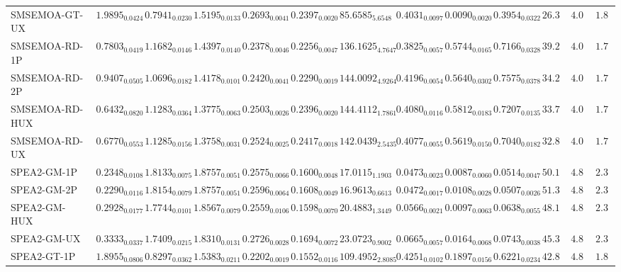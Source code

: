 \documentclass[11pt,a4paper]{article}
\begin{document}
\begin{table}[H]
{\begin{tabular}{lcccccccccccc}
SMSEMOA-GT-UX & $1.9895_{0.0424}$ & $0.7941_{0.0230}$ & $1.5195_{0.0133}$ & $\mathbf{0.2693}_{0.0041}$ & $\mathbf{0.2397}_{0.0020}$ & $85.6585_{5.6548}$ & $0.4031_{0.0097}$ & $0.0090_{0.0020}$ & $0.3954_{0.0322}$ & $26.33$ & $4.00$ & $1.89$ \\
SMSEMOA-RD-1P & $0.7803_{0.0419}$ & $1.1682_{0.0146}$ & $1.4397_{0.0140}$ & $0.2378_{0.0046}$ & $0.2256_{0.0047}$ & $136.1625_{4.7647}$ & $0.3825_{0.0057}$ & $0.5744_{0.0165}$ & $0.7166_{0.0328}$ & $39.22$ & $4.00$ & $\mathbf{1.78}$ \\
SMSEMOA-RD-2P & $0.9407_{0.0505}$ & $1.0696_{0.0182}$ & $\mathbf{1.4178}_{0.0101}$ & $0.2420_{0.0041}$ & $\mathbf{0.2290}_{0.0019}$ & $\mathbf{144.0092}_{4.9264}$ & $0.4196_{0.0054}$ & $0.5640_{0.0302}$ & $0.7575_{0.0378}$ & $34.22$ & $4.00$ & $\mathbf{1.78}$ \\
SMSEMOA-RD-HUX & $0.6432_{0.0820}$ & $1.1283_{0.0364}$ & $\mathbf{1.3775}_{0.0063}$ & $0.2503_{0.0026}$ & $\mathbf{0.2396}_{0.0020}$ & $\mathbf{144.4112}_{1.7861}$ & $0.4080_{0.0116}$ & $0.5812_{0.0183}$ & $0.7207_{0.0135}$ & $33.78$ & $4.00$ & $\mathbf{1.78}$ \\
SMSEMOA-RD-UX & $0.6770_{0.0553}$ & $1.1285_{0.0156}$ & $\mathbf{1.3758}_{0.0031}$ & $0.2524_{0.0025}$ & $\mathbf{0.2417}_{0.0018}$ & $142.0439_{2.5435}$ & $0.4077_{0.0055}$ & $0.5619_{0.0150}$ & $0.7040_{0.0182}$ & $32.89$ & $4.00$ & $\mathbf{1.78}$ \\
SPEA2-GM-1P & $0.2348_{0.0108}$ & $1.8133_{0.0075}$ & $1.8757_{0.0051}$ & $0.2575_{0.0066}$ & $0.1600_{0.0048}$ & $17.0115_{1.1903}$ & $0.0473_{0.0023}$ & $0.0087_{0.0060}$ & $0.0514_{0.0047}$ & $50.11$ & $4.89$ & $2.33$ \\
SPEA2-GM-2P & $0.2290_{0.0116}$ & $1.8154_{0.0079}$ & $1.8757_{0.0051}$ & $0.2596_{0.0064}$ & $0.1608_{0.0049}$ & $16.9613_{0.6613}$ & $0.0472_{0.0017}$ & $0.0108_{0.0028}$ & $0.0507_{0.0026}$ & $51.33$ & $4.89$ & $2.33$ \\
SPEA2-GM-HUX & $0.2928_{0.0177}$ & $1.7744_{0.0101}$ & $1.8567_{0.0079}$ & $0.2559_{0.0106}$ & $0.1598_{0.0070}$ & $20.4883_{1.3449}$ & $0.0566_{0.0021}$ & $0.0097_{0.0063}$ & $0.0638_{0.0055}$ & $48.11$ & $4.89$ & $2.33$ \\
SPEA2-GM-UX & $0.3333_{0.0337}$ & $1.7409_{0.0215}$ & $1.8310_{0.0131}$ & $\mathbf{0.2726}_{0.0028}$ & $0.1694_{0.0072}$ & $23.0723_{0.9002}$ & $0.0665_{0.0057}$ & $0.0164_{0.0068}$ & $0.0743_{0.0038}$ & $45.33$ & $4.89$ & $2.33$ \\
SPEA2-GT-1P & $1.8955_{0.0806}$ & $0.8297_{0.0362}$ & $1.5383_{0.0211}$ & $0.2202_{0.0019}$ & $0.1552_{0.0116}$ & $109.4952_{2.8085}$ & $0.4251_{0.0102}$ & $0.1897_{0.0156}$ & $0.6221_{0.0234}$ & $42.89$ & $4.89$ & $1.89$ \\

\end{tabular}}
\end{table}
\end{document}
